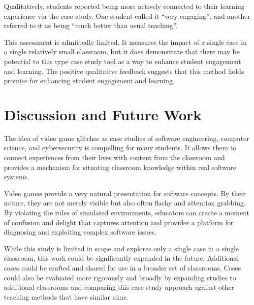 \documentclass[letterpaper]{article}
\begin{document}
Qualitatively, students reported being more actively connected to their learning experience via the case study. One student called it ``very engaging'', and another referred to it as being ``much better than usual teaching''.

This assessment is admittedly limited. It measures the impact of a single case in a single relatively small classroom, but it does demonstrate that there may be potential to this type case study tool as a way to enhance student engagement and learning. The positive qualitative feedback suggests that this method holds promise for enhancing student engagement and learning.

\section{Discussion and Future Work}

The idea of video game glitches as case studies of software engineering, computer science, and cybersecurity is compelling for many students. It allows them to connect experiences from their lives with content from the classroom and provides a mechanism for situating classroom knowledge within real software systems.

Video games provide a very natural presentation for software concepts. By their nature, they are not merely visible but also often flashy and attention grabbing. By violating the rules of simulated environments, educators can create a moment of confusion and delight that captures attention and provides a platform for diagnosing and exploiting complex software issues.

While this study is limited in scope and explores only a single case in a single classroom, this work could be significantly expanded in the future. Additional cases could be crafted and shared for use in a broader set of classrooms. Cases could also be evaluated more rigorously and broadly by expanding studies to additional classrooms and comparing this case study approach against other teaching methods that have similar aims.

%
%

\printbibliography
\end{document}
